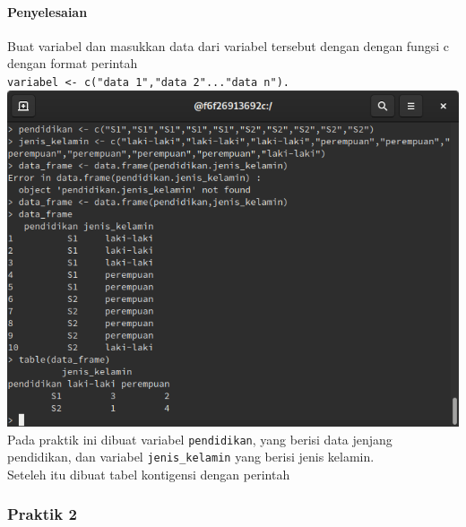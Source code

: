 \documentclass[a4paper,12pt]{article}
\begin{document}
\paragraph{Penyelesaian\\}
Buat variabel dan masukkan data dari variabel tersebut dengan dengan fungsi c dengan format perintah\\ \texttt{variabel <- c("data 1","data 2"..."data n").}\\
\includegraphics[width=\linewidth]{1}\\
Pada praktik ini dibuat variabel \texttt{pendidikan}, yang berisi data jenjang pendidikan, dan variabel \texttt{jenis\_kelamin} yang berisi jenis kelamin.\\
Seteleh itu dibuat tabel kontigensi dengan perintah
\subsubsection{Praktik 2}
\end{document}

